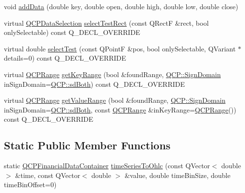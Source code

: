 \begin{DoxyCompactItemize}
\item 
void \mbox{\hyperlink{class_q_c_p_financial_a688bbd052e00a02954ddb0068b378170}{add\+Data}} (double key, double open, double high, double low, double close)
\item 
virtual \mbox{\hyperlink{class_q_c_p_data_selection}{Q\+C\+P\+Data\+Selection}} \mbox{\hyperlink{class_q_c_p_financial_a3c5beb1ab028a1dba845fc9dcffc7cf4}{select\+Test\+Rect}} (const Q\+RectF \&rect, bool only\+Selectable) const Q\+\_\+\+D\+E\+C\+L\+\_\+\+O\+V\+E\+R\+R\+I\+DE
\item 
virtual double \mbox{\hyperlink{class_q_c_p_financial_aac8e91622ac58330fa9ce81cc8fd40ee}{select\+Test}} (const Q\+PointF \&pos, bool only\+Selectable, Q\+Variant $\ast$details=0) const Q\+\_\+\+D\+E\+C\+L\+\_\+\+O\+V\+E\+R\+R\+I\+DE
\item 
virtual \mbox{\hyperlink{class_q_c_p_range}{Q\+C\+P\+Range}} \mbox{\hyperlink{class_q_c_p_financial_a15d68fb257113fef697356d65fa76559}{get\+Key\+Range}} (bool \&found\+Range, \mbox{\hyperlink{namespace_q_c_p_afd50e7cf431af385614987d8553ff8a9}{Q\+C\+P\+::\+Sign\+Domain}} in\+Sign\+Domain=\mbox{\hyperlink{namespace_q_c_p_afd50e7cf431af385614987d8553ff8a9aa38352ef02d51ddfa4399d9551566e24}{Q\+C\+P\+::sd\+Both}}) const Q\+\_\+\+D\+E\+C\+L\+\_\+\+O\+V\+E\+R\+R\+I\+DE
\item 
virtual \mbox{\hyperlink{class_q_c_p_range}{Q\+C\+P\+Range}} \mbox{\hyperlink{class_q_c_p_financial_a82d862aa134d78853f98f8c57a03415b}{get\+Value\+Range}} (bool \&found\+Range, \mbox{\hyperlink{namespace_q_c_p_afd50e7cf431af385614987d8553ff8a9}{Q\+C\+P\+::\+Sign\+Domain}} in\+Sign\+Domain=\mbox{\hyperlink{namespace_q_c_p_afd50e7cf431af385614987d8553ff8a9aa38352ef02d51ddfa4399d9551566e24}{Q\+C\+P\+::sd\+Both}}, const \mbox{\hyperlink{class_q_c_p_range}{Q\+C\+P\+Range}} \&in\+Key\+Range=\mbox{\hyperlink{class_q_c_p_range}{Q\+C\+P\+Range}}()) const Q\+\_\+\+D\+E\+C\+L\+\_\+\+O\+V\+E\+R\+R\+I\+DE
\end{DoxyCompactItemize}
\subsection*{Static Public Member Functions}
\begin{DoxyCompactItemize}
\item 
static \mbox{\hyperlink{class_q_c_p_data_container}{Q\+C\+P\+Financial\+Data\+Container}} \mbox{\hyperlink{class_q_c_p_financial_a9a058c035040d3939b8884f4aaccb1a7}{time\+Series\+To\+Ohlc}} (const Q\+Vector$<$ double $>$ \&time, const Q\+Vector$<$ double $>$ \&value, double time\+Bin\+Size, double time\+Bin\+Offset=0)
\end{DoxyCompactItemize}
